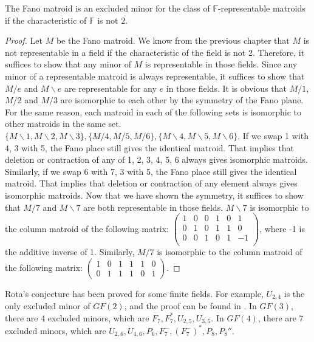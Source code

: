 \begin{thm}
The Fano matroid is an excluded minor for the class of $\mathbb{F}$-representable matroids if the characteristic of $\mathbb{F}$ is not 2.
\end{thm}
\begin{proof}
Let $M$ be the Fano matroid.
We know from the previous chapter that $M$ is not representable in a field if the characteristic of the field is not 2.
Therefore, it suffices to show that any minor of $M$ is representable in those fields.
Since any minor of a representable matroid is always representable, it suffices to show that $M / e$ and $M \backslash e$ are representable for any $e$ in those fields.
It is obvious that $M / 1$, $M / 2$ and $M / 3$ are isomorphic to each other by the symmetry of the Fano plane.
For the same reason, each matroid in each of the following sets is isomorphic to other matroids in the same set.
$\{ M \backslash 1, M \backslash 2, M \backslash 3 \}, \{ M / 4, M / 5, M / 6 \}, \{ M \backslash 4, M \backslash 5, M \backslash 6 \}$.
If we swap 1 with 4, 3 with 5, the Fano place still gives the identical matroid.
That implies that deletion or contraction of any of 1, 2, 3, 4, 5, 6 always gives isomorphic matroids.
Similarly, if we swap 6 with 7, 3 with 5, the Fano place still gives the identical matroid.
That implies that deletion or contraction of any element always gives isomorphic matroids.
Now that we have shown the symmetry, it suffices to show that $M / 7$ and $M \backslash  7$ are both representable in those fields.
$M \backslash 7$ is isomorphic to the column matroid of the following matrix:
$\begin{pmatrix}
1 & 0 & 0 & 1 & 0 & 1 \\
0 & 1 & 0 & 1 & 1 & 0 \\
0 & 0 & 1 & 0 & 1 & -1 \\
\end{pmatrix}$, where -1 is the additive inverse of 1.
Similarly, $M / 7$ is isomorphic to the column matroid of the following matrix:
$\begin{pmatrix}
1 & 0 & 1 & 1 & 1 & 0 \\
0 & 1 & 1 & 1 & 0 & 1
\end{pmatrix}$.
\end{proof}

Rota's conjecture has been proved for some finite fields.
For example, $U_{2, 4}$ is the only excluded minor of $GF(2)$, and the proof can be found in \cite{lec9}.
In $GF(3)$, there are 4 excluded minors, which are $F_7, F_7^\ast, U_{2, 5}, U_{3, 5}$.\cite{lec9}
In $GF(4)$, there are 7 excluded minors, which are $U_{2, 6}, U_{4, 6}, P_6, F_7^-, (F_7^-)^\ast, P_8, P_8''$. 
\cite{gf4}

